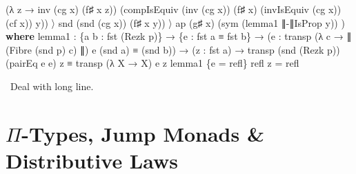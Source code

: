 \documentclass[
  11pt,
  oneside,
  article]{memoir}
\newenvironment{Shaded}{}{}
\newcommand{\KeywordTok}[1]{\textcolor[rgb]{0.00,0.44,0.13}{\textbf{#1}}}
\newcommand{\NormalTok}[1]{#1}
\newcommand{\OtherTok}[1]{\textcolor[rgb]{0.00,0.44,0.13}{#1}}
\theoremstyle{definition}
\theoremstyle{plain}
\newcommand{\0}{\textsf{0}}
\newcommand{\1}{\tn{\textsf{1}}}
\newcommand{\dnote}[1]{{\quad \color{blue}$\lozenge$\;David says:}~#1\;{\color{blue}$\lozenge$}\quad}
\begin{document}
\begin{Shaded}
\begin{Highlighting}[]
                             \OtherTok{(λ}\NormalTok{ z }\OtherTok{→}\NormalTok{ inv }\OtherTok{(}\NormalTok{cg x}\OtherTok{)} \OtherTok{(}\NormalTok{f♯ x z}\OtherTok{))} 
                             \OtherTok{(}\NormalTok{compIsEquiv }\OtherTok{(}\NormalTok{inv }\OtherTok{(}\NormalTok{cg x}\OtherTok{))} \OtherTok{(}\NormalTok{f♯ x}\OtherTok{)} 
                                          \OtherTok{(}\NormalTok{invIsEquiv }\OtherTok{(}\NormalTok{cg x}\OtherTok{))} \OtherTok{(}\NormalTok{cf x}\OtherTok{))} 
\NormalTok{                             y}\OtherTok{))}\NormalTok{ 〉 }
\NormalTok{                    snd }\OtherTok{(}\NormalTok{snd }\OtherTok{(}\NormalTok{cg x}\OtherTok{))} \OtherTok{(}\NormalTok{f♯ x y}\OtherTok{))}\NormalTok{ 〉 }
\NormalTok{            ap }\OtherTok{(}\NormalTok{g♯ x}\OtherTok{)} \OtherTok{(}\NormalTok{sym }\OtherTok{(}\NormalTok{lemma1 ∥{-}∥IsProp y}\OtherTok{))} \OtherTok{)}
    \KeywordTok{where}\NormalTok{ lemma1 }\OtherTok{:} \OtherTok{\{}\NormalTok{a b }\OtherTok{:}\NormalTok{ fst }\OtherTok{(}\NormalTok{Rezk p}\OtherTok{)\}}
                   \OtherTok{→} \OtherTok{\{}\NormalTok{e }\OtherTok{:}\NormalTok{ fst a ≡ fst b}\OtherTok{\}} 
                   \OtherTok{→} \OtherTok{(}\NormalTok{e\textquotesingle{} }\OtherTok{:}\NormalTok{ transp }\OtherTok{(λ}\NormalTok{ c }\OtherTok{→}\NormalTok{ ∥ }\OtherTok{(}\NormalTok{Fibre }\OtherTok{(}\NormalTok{snd p}\OtherTok{)}\NormalTok{ c}\OtherTok{)}\NormalTok{ ∥}\OtherTok{)} 
\NormalTok{                                  e }\OtherTok{(}\NormalTok{snd a}\OtherTok{)} 
\NormalTok{                           ≡ }\OtherTok{(}\NormalTok{snd b}\OtherTok{))}
                   \OtherTok{→} \OtherTok{(}\NormalTok{z }\OtherTok{:}\NormalTok{ fst a}\OtherTok{)}
                   \OtherTok{→}\NormalTok{ transp }\OtherTok{(}\NormalTok{snd }\OtherTok{(}\NormalTok{Rezk p}\OtherTok{))} \OtherTok{(}\NormalTok{pairEq e e\textquotesingle{}}\OtherTok{)}\NormalTok{ z}
\NormalTok{                     ≡ transp }\OtherTok{(λ}\NormalTok{ X }\OtherTok{→}\NormalTok{ X}\OtherTok{)}\NormalTok{ e z}
\NormalTok{          lemma1 }\OtherTok{\{}\NormalTok{e }\OtherTok{=}\NormalTok{ refl}\OtherTok{\}}\NormalTok{ refl z }\OtherTok{=}\NormalTok{ refl}
\end{Highlighting}
\end{Shaded}\dnote{Deal with long line.}

\chapter{\texorpdfstring{\(\Pi\)-Types, Jump Monads \& Distributive
Laws}{\textbackslash Pi-Types, Jump Monads \& Distributive Laws}}\label{pi-types-jump-monads-distributive-laws}
\end{document}
